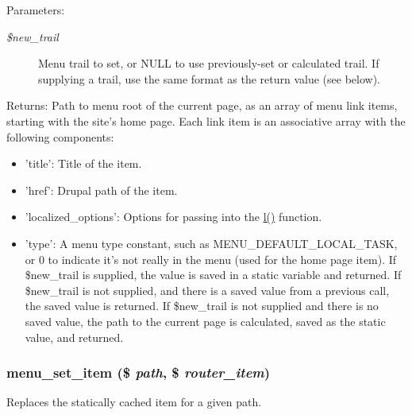 \begin{Desc}
\item[Parameters:]
\begin{description}
\item[{\em \$new\_\-trail}]Menu trail to set, or NULL to use previously-set or calculated trail. If supplying a trail, use the same format as the return value (see below). \end{description}
\end{Desc}
\begin{Desc}
\item[Returns:]Path to menu root of the current page, as an array of menu link items, starting with the site's home page. Each link item is an associative array with the following components:\begin{itemize}
\item 'title': Title of the item.\item 'href': Drupal path of the item.\item 'localized\_\-options': Options for passing into the \hyperlink{common_8inc_b1b47d5ab720066df684c335eda75cfd}{l()} function.\item 'type': A menu type constant, such as MENU\_\-DEFAULT\_\-LOCAL\_\-TASK, or 0 to indicate it's not really in the menu (used for the home page item). If \$new\_\-trail is supplied, the value is saved in a static variable and returned. If \$new\_\-trail is not supplied, and there is a saved value from a previous call, the saved value is returned. If \$new\_\-trail is not supplied and there is no saved value, the path to the current page is calculated, saved as the static value, and returned. \end{itemize}
\end{Desc}
\hypertarget{group__menu_g731543157fbe59176d20af2282df5f75}{
\subsubsection[{menu\_\-set\_\-item}]{\setlength{\rightskip}{0pt plus 5cm}menu\_\-set\_\-item (\$ {\em path}, \/  \$ {\em router\_\-item})}}
\label{group__menu_g731543157fbe59176d20af2282df5f75}


Replaces the statically cached item for a given path.

